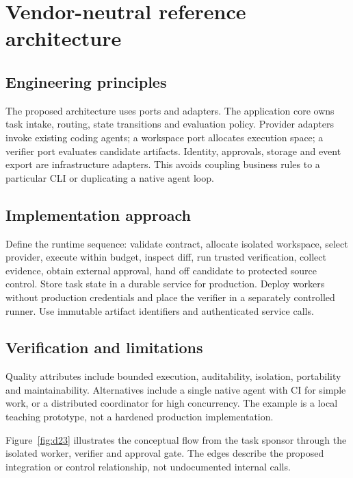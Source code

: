 \chapter{Vendor-neutral reference architecture}

\section{Engineering principles}

The proposed architecture uses ports and adapters. The application core owns task intake, routing, state transitions and evaluation policy. Provider adapters invoke existing coding agents; a workspace port allocates execution space; a verifier port evaluates candidate artifacts. Identity, approvals, storage and event export are infrastructure adapters. This avoids coupling business rules to a particular CLI or duplicating a native agent loop.

\section{Implementation approach}

Define the runtime sequence: validate contract, allocate isolated workspace, select provider, execute within budget, inspect diff, run trusted verification, collect evidence, obtain external approval, hand off candidate to protected source control. Store task state in a durable service for production. Deploy workers without production credentials and place the verifier in a separately controlled runner. Use immutable artifact identifiers and authenticated service calls.

\section{Verification and limitations}

Quality attributes include bounded execution, auditability, isolation, portability and maintainability. Alternatives include a single native agent with CI for simple work, or a distributed coordinator for high concurrency. The example is a local teaching prototype, not a hardened production implementation.

Figure~\ref{fig:d23} illustrates the conceptual flow from the task sponsor through the isolated worker, verifier and approval gate. The edges describe the proposed integration or control relationship, not undocumented internal calls.

